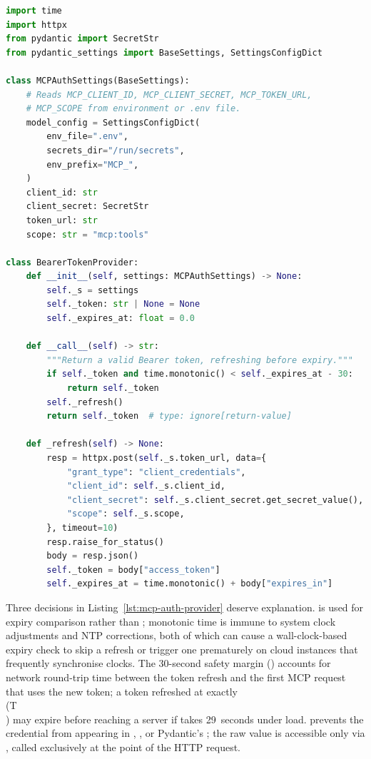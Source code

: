 \begin{lstlisting}[language=Python,
                   caption={\code{MCPAuthSettings} and \code{BearerTokenProvider}},
                   label={lst:mcp-auth-provider}]
import time
import httpx
from pydantic import SecretStr
from pydantic_settings import BaseSettings, SettingsConfigDict

class MCPAuthSettings(BaseSettings):
    # Reads MCP_CLIENT_ID, MCP_CLIENT_SECRET, MCP_TOKEN_URL,
    # MCP_SCOPE from environment or .env file.
    model_config = SettingsConfigDict(
        env_file=".env",
        secrets_dir="/run/secrets",
        env_prefix="MCP_",
    )
    client_id: str
    client_secret: SecretStr
    token_url: str
    scope: str = "mcp:tools"

class BearerTokenProvider:
    def __init__(self, settings: MCPAuthSettings) -> None:
        self._s = settings
        self._token: str | None = None
        self._expires_at: float = 0.0

    def __call__(self) -> str:
        """Return a valid Bearer token, refreshing before expiry."""
        if self._token and time.monotonic() < self._expires_at - 30:
            return self._token
        self._refresh()
        return self._token  # type: ignore[return-value]

    def _refresh(self) -> None:
        resp = httpx.post(self._s.token_url, data={
            "grant_type": "client_credentials",
            "client_id": self._s.client_id,
            "client_secret": self._s.client_secret.get_secret_value(),
            "scope": self._s.scope,
        }, timeout=10)
        resp.raise_for_status()
        body = resp.json()
        self._token = body["access_token"]
        self._expires_at = time.monotonic() + body["expires_in"]
\end{lstlisting}

Three decisions in Listing~\ref{lst:mcp-auth-provider} deserve
explanation.  is used for expiry comparison
rather than ; monotonic time is immune to system
clock adjustments and NTP corrections, both of which can cause a
wall-clock-based expiry check to skip a refresh or trigger one
prematurely on cloud instances that frequently synchronise clocks.
The 30-second safety margin () accounts
for network round-trip time between the token refresh and the first
MCP request that uses the new token; a token refreshed at exactly
\\(T\\) may expire before reaching a server if  takes
29~seconds under load.  prevents the credential from
appearing in , , or Pydantic's
; the raw value is accessible only via
, called exclusively at the point of the
HTTP request.

